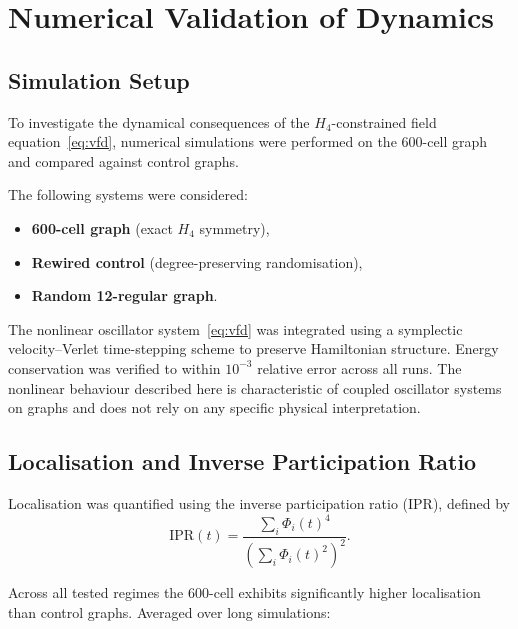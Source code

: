 \documentclass[12pt,a4paper]{article}
\newcommand{\Hfour}{H_4}
\begin{document}
\section{Numerical Validation of Dynamics}\label{sec:numerics}

\subsection{Simulation Setup}

To investigate the dynamical consequences of the $\Hfour$-constrained
field equation~\eqref{eq:vfd}, numerical simulations were performed on
the 600-cell graph and compared against control graphs.

The following systems were considered:
\begin{itemize}[nosep]
\item \textbf{600-cell graph} (exact $\Hfour$ symmetry),
\item \textbf{Rewired control} (degree-preserving randomisation),
\item \textbf{Random 12-regular graph}.
\end{itemize}

The nonlinear oscillator system~\eqref{eq:vfd} was integrated using a
symplectic velocity--Verlet time-stepping scheme to preserve Hamiltonian
structure.  Energy conservation was verified to within $10^{-3}$ relative
error across all runs.  The nonlinear behaviour described here is
characteristic of coupled oscillator systems on graphs and does not
rely on any specific physical interpretation.

\subsection{Localisation and Inverse Participation Ratio}

Localisation was quantified using the inverse participation ratio (IPR),
defined by
\begin{equation}\label{eq:ipr}
  \mathrm{IPR}(t) = \frac{\sum_i \Phi_i(t)^4}
                          {\left(\sum_i \Phi_i(t)^2\right)^2}.
\end{equation}

Across all tested regimes the 600-cell exhibits significantly higher
localisation than control graphs.  Averaged over long simulations:
\end{document}
